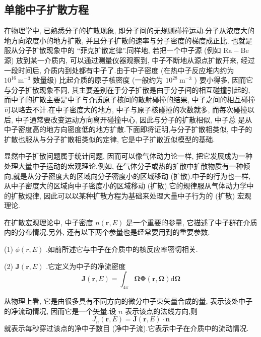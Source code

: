 \documentclass{Sichuan Normal University}
\begin{document}
\subsection{单能中子扩散方程}
在物理学中, 已熟悉分子的扩散现象, 即分子间的无规则碰撞运动.分子从浓度大的地方向浓度小的地方扩散, 并且分子扩散的速率与分子密度的梯度成正比, 也就是服从分子扩散现象中的 “菲克扩散定律”.同样地, 若把一个中子源 (例如 $\mathrm{Ra}-\mathrm{Be}$ 源) 放到某一介质内, 可以通过测量仪器观察到, 中子不断地从源点扩散开来, 经过一段时间后, 介质内到处都有中子了.由于中子密度 (在热中子反应堆内约为 $10^{16} \mathrm{~m}^{-3}$ 数量级) 比起介质的原子核密度 (一般约为 $10^{28} \mathrm{~m}^{-3}$ ) 要小得多, 因而它与分子扩散现象不同, 其主要差别在于分子扩散是由于分子间的相互碰撞引起的, 而中子的扩散主要是中子与介质原子核间的散射碰撞的结果, 中子之间的相互碰撞可以略去不计.在中子密度大的地方, 中子与原子核碰撞的次数就多, 而每次碰撞以后, 中子通常要改变运动方向离开碰撞中心, 因此与分子的扩散相似, 中子总
是从中子密度高的地方向密度低的地方扩散.下面即将证明,与分子扩散相类似, 中子的扩散也服从与分子扩散相类似的定律, 它是中子扩散近似模型的基础.

显然中子扩散问题属于统计问题, 因而可以像气体动力论一样, 把它发展成为一种处理大量中子运动的宏观理论.例如, 在气体分子或热的扩散中扩散物质有一种倾向,就是从分子密度大的区域向分子密度小的区域移动 (扩散).中子的行为也一样, 从中子密度大的区域向中子密度小的区域移动 (扩散).它的规律服从气体动力学中的扩散规律, 因此可以以某种扩散方程为基础来处理大量中子行为的 (扩散) 宏观理论.

在扩散宏观理论中, 中子密度 $n(\boldsymbol{r}, E)$ 是一个重要的参量, 它描述了中子群在介质内的分布情况.另外, 还有以下两个参量也是经常要用到的重要参数.

(1) $\phi(r, E)$ .如前所述它与中子在介质中的核反应率密切相关.

(2) $\boldsymbol{J}(\boldsymbol{r}, E)$ .它定义为中子的净流密度
\begin{equation}
    \boldsymbol{J}(\boldsymbol{r}, E)=\int_{4 \pi} \boldsymbol{\Omega} \boldsymbol{\Phi}(\boldsymbol{r}, \boldsymbol{\Omega}) \mathrm{d} \boldsymbol{\Omega}
    \label{eq:中子的净流密度}
\end{equation}

从物理上看, 它是由很多具有不同方向的微分中子束矢量合成的量, 表示该处中子的净流动情况, 因而它是一个矢量.设 $n$ 表示该点的法线方向,则
\begin{equation}
    J_n(\boldsymbol{r}, E)=\boldsymbol{J}(\boldsymbol{r}, E) \cdot \boldsymbol{n}
    \label{eq:中子的净流密度2}
\end{equation}
就表示每秒穿过该点的净中子数目 (净中子流).它表示中子在介质中的流动情况.
\end{document}
